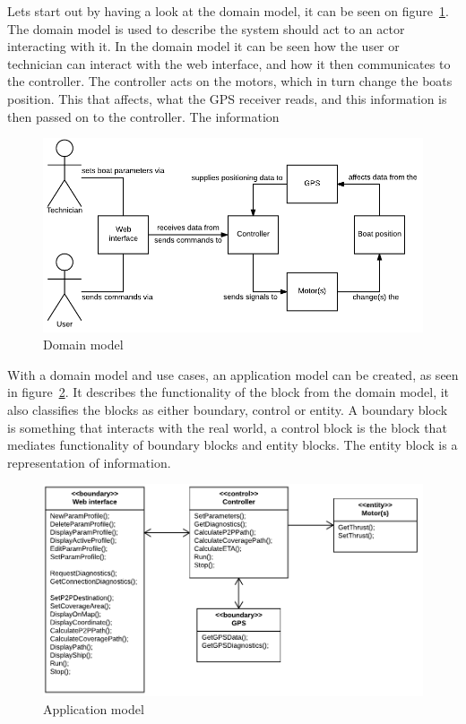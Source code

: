 Lets start out by having a look at the domain model, it can be seen on figure~\ref{fig:domainmodel}. The domain model is used to describe the system should act to an actor interacting with it. In the domain model it can be seen how the user or technician can interact with the web interface, and how it then communicates to the controller. The controller acts on the motors, which in turn change the boats position. This that affects, what the GPS receiver reads, and this information is then passed on to the controller. The information 

\begin{figure}[H]
\centering
\includegraphics[width=1\linewidth]{../Appendix/Project/Dokumentation/Images/System_architecture/Domain_Model}
\caption{Domain model}
\label{fig:domainmodel}
\end{figure}

With a domain model and use cases, an application model can be created, as seen in figure~\ref{fig:applicationmodel}. It describes the functionality of the block from the domain model, it also classifies the blocks as either boundary, control or entity. A boundary block is something that interacts with the real world, a control block is the block that mediates functionality of boundary blocks and entity blocks. The entity block is a representation of information.

\begin{figure}[H]
\centering
\includegraphics[width=1\linewidth]{../Appendix/Project/Dokumentation/Images/System_architecture/Application_Model}
\caption{Application model}
\label{fig:applicationmodel}
\end{figure}

